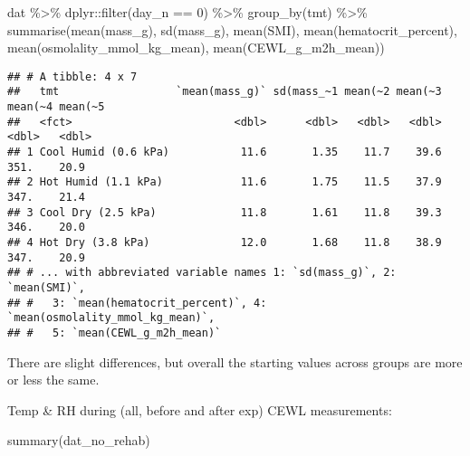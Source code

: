 \documentclass[
]{article}
\newenvironment{Shaded}{\begin{snugshade}}{\end{snugshade}}
\newcommand{\DecValTok}[1]{\textcolor[rgb]{0.00,0.00,0.81}{#1}}
\newcommand{\FunctionTok}[1]{\textcolor[rgb]{0.00,0.00,0.00}{#1}}
\newcommand{\NormalTok}[1]{#1}
\newcommand{\SpecialCharTok}[1]{\textcolor[rgb]{0.00,0.00,0.00}{#1}}
\begin{document}
\begin{Shaded}
\begin{Highlighting}[]
\NormalTok{dat }\SpecialCharTok{\%\textgreater{}\%}
\NormalTok{  dplyr}\SpecialCharTok{::}\FunctionTok{filter}\NormalTok{(day\_n }\SpecialCharTok{==} \DecValTok{0}\NormalTok{) }\SpecialCharTok{\%\textgreater{}\%}
  \FunctionTok{group\_by}\NormalTok{(tmt) }\SpecialCharTok{\%\textgreater{}\%}
  \FunctionTok{summarise}\NormalTok{(}\FunctionTok{mean}\NormalTok{(mass\_g),}
            \FunctionTok{sd}\NormalTok{(mass\_g),}
            \FunctionTok{mean}\NormalTok{(SMI),}
            \FunctionTok{mean}\NormalTok{(hematocrit\_percent),}
            \FunctionTok{mean}\NormalTok{(osmolality\_mmol\_kg\_mean),}
            \FunctionTok{mean}\NormalTok{(CEWL\_g\_m2h\_mean))}
\end{Highlighting}
\end{Shaded}

\begin{verbatim}
## # A tibble: 4 x 7
##   tmt                  `mean(mass_g)` sd(mass_~1 mean(~2 mean(~3 mean(~4 mean(~5
##   <fct>                         <dbl>      <dbl>   <dbl>   <dbl>   <dbl>   <dbl>
## 1 Cool Humid (0.6 kPa)           11.6       1.35    11.7    39.6    351.    20.9
## 2 Hot Humid (1.1 kPa)            11.6       1.75    11.5    37.9    347.    21.4
## 3 Cool Dry (2.5 kPa)             11.8       1.61    11.8    39.3    346.    20.0
## 4 Hot Dry (3.8 kPa)              12.0       1.68    11.8    38.9    347.    20.9
## # ... with abbreviated variable names 1: `sd(mass_g)`, 2: `mean(SMI)`,
## #   3: `mean(hematocrit_percent)`, 4: `mean(osmolality_mmol_kg_mean)`,
## #   5: `mean(CEWL_g_m2h_mean)`
\end{verbatim}

There are slight differences, but overall the starting values across
groups are more or less the same.

Temp \& RH during (all, before and after exp) CEWL measurements:

\begin{Shaded}
\begin{Highlighting}[]
\FunctionTok{summary}\NormalTok{(dat\_no\_rehab)}
\end{Highlighting}
\end{Shaded}
\end{document}
